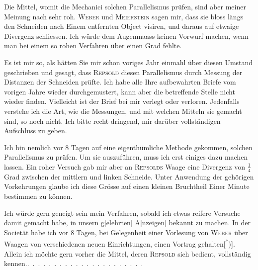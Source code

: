 Die  Mittel, womit die Mechanici solchen Parallelismus
prüfen, sind aber meiner Meinung nach sehr roh. \textsc{Weber} und \textsc{Meierstein}
sagen mir, dass sie bloss längs den Schneiden nach Einem entfernten Object
visiren, und daraus auf etwaige Divergenz schliessen. Ich würde dem Augenmaass
keinen Vorwurf machen, wenn man bei einem so rohen Verfahren über
einen Grad fehlte.

Es ist mir so, als hätten Sie mir schon voriges Jahr einmahl über diesen
Umstand geschrieben und gesagt, dass \textsc{Repsold} diesen Parallelismus durch
Messung der Distanzen der Schneiden prüfte. Ich habe alle Ihre aufbewahrten
Briefe vom vorigen Jahre wieder durchgemustert, kann aber die betreffende
Stelle nicht wieder finden. Vielleicht ist der Brief bei mir verlegt oder verloren.
Jedenfalls verstehe ich die Art, wie die Messungen, und mit welchen
Mitteln sie gemacht sind, so noch nicht. Ich bitte recht dringend, mir
darüber vollständigen Aufschluss zu geben.

Ich bin nemlich vor 8 Tagen auf eine eigenthümliche Methode gekommen,
solchen Parallelismus zu prüfen. Um sie  auszuführen, muss ich erst
einiges dazu machen lassen. Ein roher Versuch gab mir aber an \textsc{Repsolds}
Waage eine Divergenz von \(\tfrac{1}{4}\) Grad zwischen der mittlern und linken Schneide.
Unter Anwendung der gehörigen Vorkehrungen glaube ich diese Grösse auf
einen kleinen Bruchtheil Einer Minute bestimmen zu können.

Ich würde gern geneigt sein mein Verfahren, sobald ich etwas reifere
\clearpage{}
\noindent Versuche damit gemacht habe, in unsern g[elehrten] A[nzeigen] bekannt zu
machen. In der Societät habe ich vor 8 Tagen, bei Gelegenheit einer Vorlesung
von \textsc{Weber} über Waagen von verschiedenen neuen Einrichtungen, einen
Vortrag gehalten[\textsuperscript{*})]\begingroup\renewcommand{\thefootnote}{}\endgroup. Allein ich möchte gern vorher die Mittel, deren \textsc{Repsold}
sich bedient, vollständig kennen.\quad .\ .\ .\ .\ .\ .\ .\ .\ .\ .\ .\ .\ .\ .\ .\ .\ .\ .\ .\ .\ .\ .
\clearpage\endgroup
